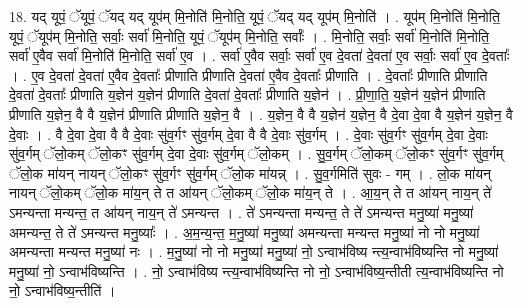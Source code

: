 \documentclass[17pt]{extarticle}
\begin{document}
18. यद् यूपं॒ ॅयूपं॒ ॅयद् यद् यूप॑म् मि॒नोति॑ मि॒नोति॒ यूपं॒ ॅयद् यद् यूप॑म् मि॒नोति॑ । . यूप॑म् मि॒नोति॑ मि॒नोति॒ यूपं॒ ॅयूप॑म् मि॒नोति॒ सर्वाः॒ सर्वा॑ मि॒नोति॒ यूपं॒ ॅयूप॑म् मि॒नोति॒ सर्वाः᳚ । . मि॒नोति॒ सर्वाः॒ सर्वा॑ मि॒नोति॑ मि॒नोति॒ सर्वा॑ ए॒वैव सर्वा॑ मि॒नोति॑ मि॒नोति॒ सर्वा॑ ए॒व । . सर्वा॑ ए॒वैव सर्वाः॒ सर्वा॑ ए॒व दे॒वता॑ दे॒वता॑ ए॒व सर्वाः॒ सर्वा॑ ए॒व दे॒वताः᳚ । . ए॒व दे॒वता॑ दे॒वता॑ ए॒वैव दे॒वताः᳚ प्रीणाति प्रीणाति दे॒वता॑ ए॒वैव दे॒वताः᳚ प्रीणाति । . दे॒वताः᳚ प्रीणाति प्रीणाति दे॒वता॑ दे॒वताः᳚ प्रीणाति य॒ज्ञेन॑ य॒ज्ञेन॑ प्रीणाति दे॒वता॑ दे॒वताः᳚ प्रीणाति य॒ज्ञेन॑ । . प्री॒णा॒ति॒ य॒ज्ञेन॑ य॒ज्ञेन॑ प्रीणाति प्रीणाति य॒ज्ञेन॒ वै वै य॒ज्ञेन॑ प्रीणाति प्रीणाति य॒ज्ञेन॒ वै । . य॒ज्ञेन॒ वै वै य॒ज्ञेन॑ य॒ज्ञेन॒ वै दे॒वा दे॒वा वै य॒ज्ञेन॑ य॒ज्ञेन॒ वै दे॒वाः । . वै दे॒वा दे॒वा वै वै दे॒वाः सु॑व॒र्गꣳ सु॑व॒र्गम् दे॒वा वै वै दे॒वाः सु॑व॒र्गम् । . दे॒वाः सु॑व॒र्गꣳ सु॑व॒र्गम् दे॒वा दे॒वाः सु॑व॒र्गम् ॅलो॒कम् ॅलो॒कꣳ सु॑व॒र्गम् दे॒वा दे॒वाः सु॑व॒र्गम् ॅलो॒कम् । . सु॒व॒र्गम् ॅलो॒कम् ॅलो॒कꣳ सु॑व॒र्गꣳ सु॑व॒र्गम् ॅलो॒क मा॑यन् नायन् ॅलो॒कꣳ सु॑व॒र्गꣳ सु॑व॒र्गम् ॅलो॒क मा॑यन्न् । . सु॒व॒र्गमिति॑ सुवः - गम् । . लो॒क मा॑यन् नायन् ॅलो॒कम् ॅलो॒क मा॑य॒न् ते त आ॑यन् ॅलो॒कम् ॅलो॒क मा॑य॒न् ते । . आ॒य॒न् ते त आ॑यन् नाय॒न् ते॑ ऽमन्यन्ता मन्यन्त॒ त आ॑यन् नाय॒न् ते॑ ऽमन्यन्त । . ते॑ ऽमन्यन्ता मन्यन्त॒ ते ते॑ ऽमन्यन्त मनु॒ष्या॑ मनु॒ष्या॑ अमन्यन्त॒ ते ते॑ ऽमन्यन्त मनु॒ष्याः᳚ । . अ॒म॒न्य॒न्त॒ म॒नु॒ष्या॑ मनु॒ष्या॑ अमन्यन्ता मन्यन्त मनु॒ष्या॑ नो नो मनु॒ष्या॑ अमन्यन्ता मन्यन्त मनु॒ष्या॑ नः । . म॒नु॒ष्या॑ नो नो मनु॒ष्या॑ मनु॒ष्या॑ नो॒ ऽन्वाभ॑विष्य न्त्य॒न्वाभ॑विष्यन्ति नो मनु॒ष्या॑ मनु॒ष्या॑ नो॒ ऽन्वाभ॑विष्यन्ति । . नो॒ ऽन्वाभ॑विष्य न्त्य॒न्वाभ॑विष्यन्ति नो नो॒ ऽन्वाभ॑विष्य॒न्तीती त्य॒न्वाभ॑विष्यन्ति नो नो॒ ऽन्वाभ॑विष्य॒न्तीति॑ । \newline
\end{document}
